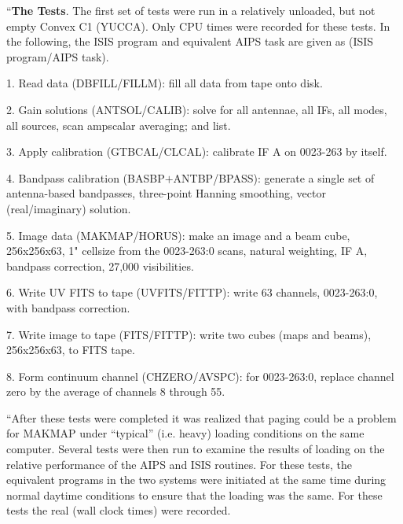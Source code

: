 {``{\bf The Tests}. The first set of tests were run in a relatively
unloaded, but not empty Convex C1 (YUCCA).  Only CPU times were
recorded for these tests. In the following, the ISIS program and
equivalent AIPS task are given as (ISIS program/AIPS task).

\item{1.} Read data (DBFILL/FILLM): fill all data from tape onto disk.
\item{2.} Gain solutions (ANTSOL/CALIB): solve for all antennae, all
IFs, all modes, all sources, scan ampscalar averaging; and list.
\item{3.}  Apply calibration (GTBCAL/CLCAL): calibrate IF A on
0023-263 by itself.
\item{4.} Bandpass calibration (BASBP$+$ANTBP/BPASS): generate a
single set of antenna-based bandpasses, three-point Hanning smoothing,
vector (real/imaginary)
solution.
\item{5.} Image data (MAKMAP/HORUS): make an image and a beam cube,
256x256x63, 1"
cellsize from  the 0023-263:0 scans, natural weighting, IF A, bandpass
correction, 27,000 visibilities.
\item{6.} Write UV FITS to tape (UVFITS/FITTP): write 63 channels,
0023-263:0, with bandpass correction.
\item{7.} Write image to tape (FITS/FITTP): write two cubes (maps and
beams), 256x256x63, to FITS tape.
\item{8.} Form continuum channel (CHZERO/AVSPC): for 0023-263:0,
replace channel zero by the average of  channels 8 through 55.

   ``After these tests were completed it was realized that paging could
be a problem for MAKMAP under ``typical'' (i.e. heavy) loading
conditions on the same computer. Several tests were then run to
examine the results of loading on the relative performance of the AIPS
and ISIS routines.  For these tests, the equivalent programs in the two
systems were initiated at the same time during normal daytime
conditions to ensure that the loading was the same.  For these tests
the real (wall clock times) were recorded.

}
